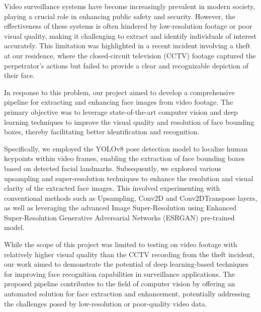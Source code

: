 Video surveillance systems have become increasingly prevalent in modern society, playing a crucial role in enhancing public safety and security. However, the effectiveness of these systems is often hindered by low-resolution footage or poor visual quality, making it challenging to extract and identify individuals of interest accurately. This limitation was highlighted in a recent incident involving a theft at our residence, where the closed-circuit television (CCTV) footage captured the perpetrator's actions but failed to provide a clear and recognizable depiction of their face.

In response to this problem, our project aimed to develop a comprehensive pipeline for extracting and enhancing face images from video footage. The primary objective was to leverage state-of-the-art computer vision and deep learning techniques to improve the visual quality and resolution of face bounding boxes, thereby facilitating better identification and recognition.

Specifically, we employed the YOLOv8 pose detection model to localize human keypoints within video frames, enabling the extraction of face bounding boxes based on detected facial landmarks. Subsequently, we explored various upsampling and super-resolution techniques to enhance the resolution and visual clarity of the extracted face images. This involved experimenting with conventional methods such as Upsampling, Conv2D and Conv2DTranspose layers, as well as leveraging the advanced Image Super-Resolution using Enhanced Super-Resolution Generative Adversarial Networks (ESRGAN) pre-trained model.

While the scope of this project was limited to testing on video footage with relatively higher visual quality than the CCTV recording from the theft incident, our work aimed to demonstrate the potential of deep learning-based techniques for improving face recognition capabilities in surveillance applications. The proposed pipeline contributes to the field of computer vision by offering an automated solution for face extraction and enhancement, potentially addressing the challenges posed by low-resolution or poor-quality video data.

